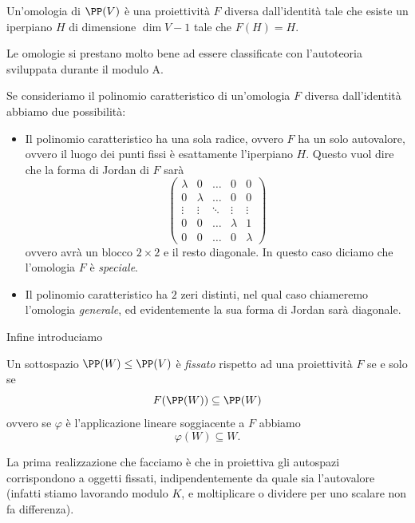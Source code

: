 \documentclass[11pt]{scrartcl}
\begin{document}
   	 \begin{definition}[Omologia]
   	 	Un'omologia di $\PP(V)$ è una proiettività $F$ diversa dall'identità tale che esiste un iperpiano $H$ di dimensione $\dim V-1$ tale che $F(H)=H$. 
   	 \end{definition}
   	 Le omologie si prestano molto bene ad essere classificate con l'autoteoria sviluppata durante il modulo A. 
   	 \begin{definition}
   	 	Se consideriamo il polinomio caratteristico di un'omologia $F$ diversa dall'identità abbiamo due possibilità:
   	 	\begin{itemize}
   	 		\item Il polinomio caratteristico ha una sola radice, ovvero $F$ ha un solo autovalore, ovvero il luogo dei punti fissi è esattamente l'iperpiano $H$. Questo vuol dire che la forma di Jordan di $F$ sarà
   	 		$$
   	 		\begin{pmatrix}
   	 			\lambda & 0 & \dots & 0 & 0\\
   	 			0 & \lambda & \dots & 0 & 0 \\
   	 			\vdots &\vdots & \ddots & \vdots & \vdots \\
   	 			0 & 0 & \dots & \lambda & 1 \\
   	 			0 & 0 & \dots & 0 & \lambda 
   	 		\end{pmatrix}
   	 		$$
   	 		ovvero avrà un blocco $2\times 2$ e il resto diagonale. In questo caso diciamo che l'omologia $F$ è \textit{speciale}. 
   	 		\item Il polinomio caratteristico ha $2$ zeri distinti, nel qual caso chiameremo l'omologia \textit{generale}, ed evidentemente la sua forma di Jordan sarà diagonale. 
   	 	\end{itemize}
   	 \end{definition}
   	 Infine introduciamo
   	 \begin{definition}
   	 	Un sottospazio $\PP(W)\le \PP(V)$ è \textit{fissato} rispetto ad una proiettività $F$ se e solo se 
   	 	$$F(\PP(W))\subseteq \PP(W)$$
   	 	ovvero se $\varphi$ è l'applicazione lineare soggiacente a $F$ abbiamo
   	 	$$\varphi(W)\subseteq W.$$
   	 \end{definition}
   	 La prima realizzazione che facciamo è che in proiettiva gli autospazi corrispondono a oggetti fissati, indipendentemente da quale sia l'autovalore (infatti stiamo lavorando modulo $K$, e moltiplicare o dividere per uno scalare non fa differenza).
\end{document}
